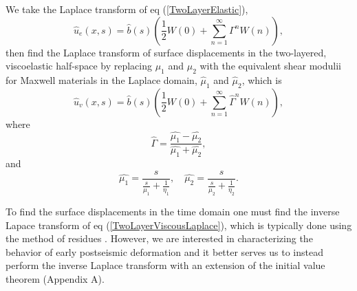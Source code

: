 \documentclass[extra]{gji}
\begin{document}
We take the Laplace transform of eq (\ref{TwoLayerElastic}),
\begin{equation}\label{TwoLayerElasticLaplace}
 \hat{u}_e(x,s) = \hat{b}(s)\left(\frac{1}{2} W(0) +\sum_{n=1}^\infty\Gamma^nW(n)\right),
\end{equation}
then find the Laplace transform of surface displacements in the
two-layered, viscoelastic half-space by replacing $\mu_1$ and $\mu_2$
with the equivalent shear modulii for Maxwell materials in the Laplace
domain, $\hat{\mu}_1$ and $\hat{\mu}_2$, which is
\begin{equation}\label{TwoLayerViscousLaplace}
 \hat{u}_v(x,s) = \hat{b}(s)\left(\frac{1}{2}W(0) +\sum_{n=1}^\infty\hat{\Gamma}^nW(n)\right),
\end{equation}
where
\begin{equation}
  \hat{\Gamma} = \frac{\hat{\mu_1} - \hat{\mu_2}}{\hat{\mu_1} + \hat{\mu_2}},
\end{equation}
and
\begin{equation}
  \hat{\mu_1} = \frac{s}{\frac{s}{\mu_1} + \frac{1}{\eta_1}},\quad \hat{\mu_2} = \frac{s}{\frac{s}{\mu_2} + \frac{1}{\eta_2}}.
\end{equation}

To find the surface displacements in the time domain one must find the
inverse Lapace transform of eq (\ref{TwoLayerViscousLaplace}), which
is typically done using the method of residues
\citep[e.g.][]{NM1974}. However, we are interested in characterizing
the behavior of early postseismic deformation and it better serves
us to instead perform the inverse Laplace transform with an extension
of the initial value theorem (Appendix A).
\end{document}
